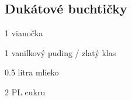 \setcounter{step}{0}
\subsection{Dukátové buchtičky}

\begin{ingredient}
\begin{main}
	\item 1 vianočka
	\item 1 vanilkový puding / zlatý klas
	\item 0.5 litra mlieko
	\item 2 PL cukru
\end{main}
\end{ingredient}%
\begin{recipe}




\end{recipe}

\begin{notes}

\end{notes}	
